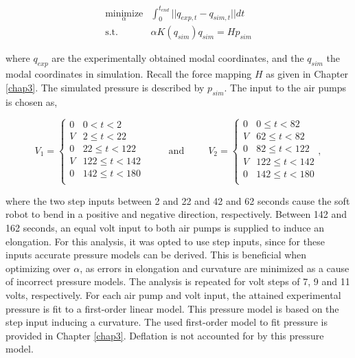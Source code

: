 \begin{equation}
\begin{split}
    \underset{\alpha}{\text{minimize}}&\int_0^{t_{end}}||q_{exp,t} - q_{sim,t}||dt  \\
    \text{s.t.} \hspace{10pt} & \alpha K(q_{sim}) q_{sim} = Hp_{sim}
    \end{split}
    \label{eq5:optalpha}
\end{equation}

where $q_{exp}$ are the experimentally obtained modal coordinates, and the $q_{sim}$ the modal coordinates in simulation. Recall the force mapping $H$ as given in Chapter \ref{chap3}. The simulated pressure is described by $p_{sim}$. The input to the air pumps is chosen as,

\begin{equation}
    V_1 =
\begin{cases}
0 & 0 < t < 2\\
V & 2 \leq t < 22\\
0 & 22 \leq t < 122\\
V & 122 \leq t < 142\\
0 & 142 \leq t < 180\\
\end{cases} \hspace{30pt} \text{and} \hspace{30pt}      V_2 =
\begin{cases}
0 & 0 \leq t < 82\\
V & 62 \leq t < 82\\
0 & 82 \leq t < 122\\
V & 122 \leq t < 142\\
0 & 142 \leq t < 180\\
\end{cases} ,
\end{equation}

where the two step inputs between 2 and 22 and 42 and 62 seconds cause the soft robot to bend in a positive and negative direction, respectively. Between 142 and 162 seconds, an equal volt input to both air pumps is supplied to induce an elongation. For this analysis, it was opted to use step inputs, since for these inputs accurate pressure models can be derived. This is beneficial when optimizing over $\alpha$, as errors in elongation and curvature are minimized as a cause of incorrect pressure models. The analysis is repeated for volt steps of 7, 9 and 11 volts, respectively. For each air pump and volt input, the attained experimental pressure is fit to a first-order linear model. This pressure model is based on the step input inducing a curvature. The used first-order model to fit pressure is provided in Chapter \ref{chap3}. Deflation is not accounted for by this pressure model. 

